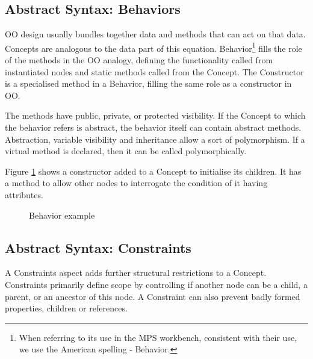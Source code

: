 \subsection{Abstract Syntax: Behaviors}
OO design usually bundles together data and methods that can act on that data.
Concepts are analogous to the data part of this equation.
Behavior\footnote{When referring to its use in the MPS workbench, consistent with their use, we use the American spelling - Behavior.}
fills the role of the methods in the OO analogy, defining the functionality called from instantiated nodes and static methods called from the Concept.
The Constructor is a specialised method in a Behavior, filling the same role as a constructor in OO.

The methods have public, private, or protected visibility.
If the Concept to which the behavior refers is abstract, the behavior itself can contain abstract methods.
Abstraction, variable visibility and inheritance allow a sort of polymorphism.
If a virtual method is declared, then it can be called polymorphically.

Figure \ref{fig:behavior_example} shows a constructor added to a Concept to initialise its children.
It has a method to allow other nodes to interrogate the condition of it having attributes.

\begin{figure}[h]
    \centering
    \caption{Behavior example}
    \label{fig:behavior_example}
\end{figure}
 
\subsection{Abstract Syntax: Constraints}
A Constraints aspect adds further structural restrictions to a Concept.
Constraints primarily define scope by controlling if another node can be a child, a parent, or an ancestor of this node.
A Constraint can also prevent badly formed properties, children or references.


